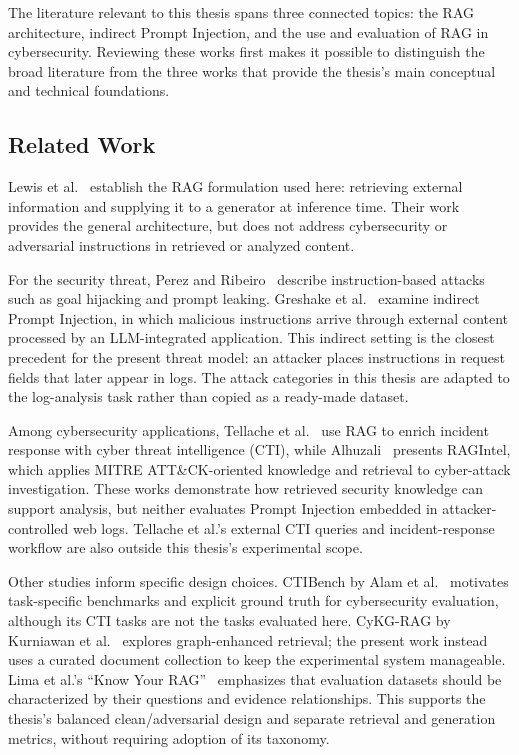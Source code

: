 The literature relevant to this thesis spans three connected topics: the
RAG architecture, indirect Prompt Injection, and the use and evaluation of
RAG in cybersecurity. Reviewing these works first makes it possible to
distinguish the broad literature from the three works that provide the
thesis's main conceptual and technical foundations.

\subsection{Related Work}\label{related-work-overview}

Lewis et al.~\cite{lewis2020rag} establish the RAG formulation used here:
retrieving external information and supplying it to a generator at
inference time. Their work provides the general architecture, but does not
address cybersecurity or adversarial instructions in retrieved or analyzed
content.

For the security threat, Perez and Ribeiro~\cite{perez2022ignore} describe
instruction-based attacks such as goal hijacking and prompt leaking.
Greshake et al.~\cite{greshake2023indirect} examine indirect Prompt
Injection, in which malicious instructions arrive through external content
processed by an LLM-integrated application. This indirect setting is the
closest precedent for the present threat model: an attacker places
instructions in request fields that later appear in logs. The attack
categories in this thesis are adapted to the log-analysis task rather than
copied as a ready-made dataset.

Among cybersecurity applications, Tellache et
al.~\cite{tellache2025incident} use RAG to enrich incident response with
cyber threat intelligence (CTI), while Alhuzali~\cite{alhuzali2025ragintel}
presents RAGIntel, which applies MITRE ATT\&CK-oriented knowledge and
retrieval to cyber-attack investigation. These works demonstrate how
retrieved security knowledge can support analysis, but neither evaluates
Prompt Injection embedded in attacker-controlled web logs. Tellache et al.'s
external CTI queries and incident-response workflow are also outside this
thesis's experimental scope.

Other studies inform specific design choices. CTIBench by Alam et
al.~\cite{alam2024ctibench} motivates task-specific benchmarks and explicit
ground truth for cybersecurity evaluation, although its CTI tasks are not
the tasks evaluated here. CyKG-RAG by Kurniawan et
al.~\cite{kurniawan2024cykgrag} explores graph-enhanced retrieval; the
present work instead uses a curated document collection to keep the
experimental system manageable. Lima et al.'s ``Know Your
RAG''~\cite{lima2024knowyourrag} emphasizes that evaluation datasets should
be characterized by their questions and evidence relationships. This
supports the thesis's balanced clean/adversarial design and separate
retrieval and generation metrics, without requiring adoption of its
taxonomy.

